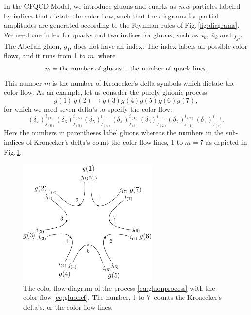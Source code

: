 \documentclass[a4paper,11pt]{article}
\begin{document}
In the CFQCD Model, we introduce gluons and quarks as {\it new}
particles labeled by indices that dictate the color flow, such that the
diagrams for partial amplitudes are generated according to the Feynman rules of
Fig.\,\ref{fig:diagrams}. We need one index for quarks and two indices for gluons, such as $u_k$,
$\overline{u}_k$ and $g_{ji}$. The Abelian gluon, $g_0$, does not
have an index.
 The index labels all possible color flows, and it
 runs from 1 to $m$, where
\begin{equation}
  m = {\rm the\,\, number\,\, of\,\, gluons} + {\rm the\,\, number\,\,
  of\,\, quark\,\, lines}.
\label{eq:m}
\end{equation}
This number $m$ is the number of Kronecker's delta symbols which dictate the color flow.
As an example, let us consider the purely gluonic process
\begin{equation}
g(1)\,g(2)\rightarrow g(3)g(4)g(5)g(6)g(7),
\label{eq:gluonprocess}
\end{equation}
for which we need seven delta's to specify the color flow:
\begin{equation}
(\delta_7)^{i_{(7)}}_{j_{(6)}}(\delta_6)^{i_{(6)}}_{j_{(5)}}
(\delta_5)^{i_{(5)}}_{j_{(4)}}(\delta_4)^{i_{(4)}}_{j_{(3)}}(\delta_3)^{i_{(3)}}_{j_{(2)}}
(\delta_2)^{i_{(2)}}_{j_{(1)}}(\delta_1)^{i_{(1)}}_{j_{(7)}}.
\label{eq:gluoncf}
\end{equation}
Here the numbers in parentheses label gluons
whereas the numbers in the sub-indices of Kronecker's delta's count the color-flow lines, 1 to $m=7$ as depicted in
 Fig.\,\ref{fig:cfgluon}.
\begin{figure}
\begin{center}
\includegraphics[width=70mm,height=64mm]{./figures/cfgluon1.eps}
\caption{The color-flow diagram of the process \eqref{eq:gluonprocess}
 with the color flow \eqref{eq:gluoncf}. The number, 1 to 7, counts the
 Kronecker's delta's, or the color-flow lines.}
\label{fig:cfgluon}
\end{center}
\end{figure}
\end{document}

